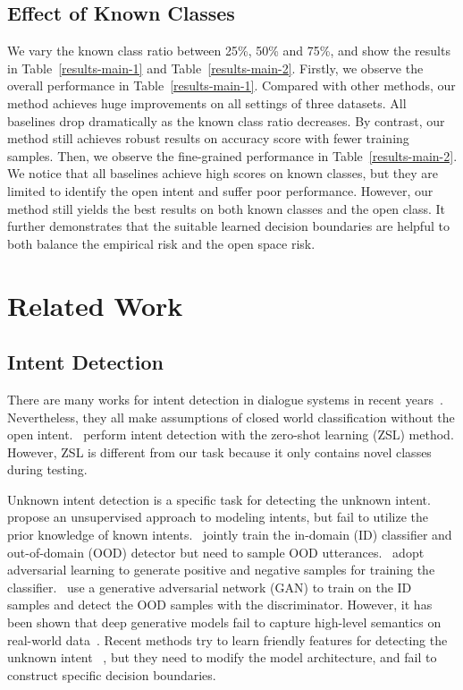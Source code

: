 \documentclass[letterpaper]{article} %
\begin{document}
\subsection{Effect of Known Classes}
We vary the known class ratio between 25\%, 50\% and 75\%, and show the results in Table~\ref{results-main-1} and Table~\ref{results-main-2}. Firstly, we observe the overall performance in Table~\ref{results-main-1}. Compared with other methods, our method achieves huge improvements on all settings of three datasets. All baselines drop dramatically as the known class ratio decreases. By contrast, our method still achieves robust results on accuracy score with fewer training samples.  Then, we observe the fine-grained performance in Table~\ref{results-main-2}. We notice that all baselines achieve high scores on known classes, but they are limited to identify the open intent and suffer poor performance. However, our method still yields the best results on both known classes and the open class. It further demonstrates that the suitable learned decision boundaries are helpful to both balance the empirical risk and the open space risk.

\vspace{-2.29mm}
\section{Related Work}
\subsection{Intent Detection}
There are many works for intent detection in dialogue systems in recent years~\cite{ijcai2020-532,Qin_Che_Li_Ni_Liu_2020,zhang-etal-2019-joint,e-etal-2019-novel,qin-etal-2019-stack}. Nevertheless, they all make assumptions of closed world classification without the open intent.~\citet{srivastava-etal-2018-zero} perform intent detection with the zero-shot learning (ZSL) method. However, ZSL is different from our task because it only contains novel classes during testing.

Unknown intent detection is a specific task for detecting the unknown intent.~\citet{Brychcin2017UnsupervisedDA} propose an unsupervised approach to modeling intents,  but fail to utilize the prior knowledge of known intents.~\citet{Kim2018JointLO} jointly train the in-domain (ID) classifier and out-of-domain (OOD) detector but need to sample OOD utterances.~\citet{Yu2017OpenCategoryCB} adopt adversarial learning to generate positive and negative samples for training the classifier.~\citet{ryu-etal-2018-domain} use a generative adversarial network (GAN) to train on the ID samples and detect the OOD samples with the discriminator. However, it has been shown that deep generative models fail to capture high-level semantics on real-world data~\cite{2018arXiv181009136N,Mundt_2019_ICCV}. Recent methods try to learn friendly features for detecting the unknown intent ~\cite{lin-xu-2019-deep,gangal2020likelihood,yan-etal-2020-unknown}, but they need to modify the  model architecture, and fail to construct specific decision boundaries.
\end{document}
